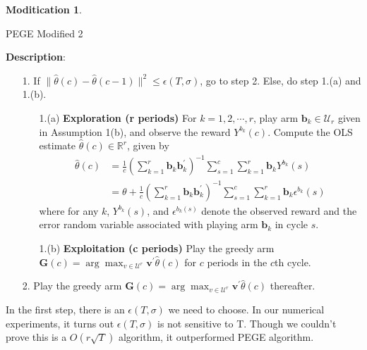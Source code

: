 \documentclass{article}
\theoremstyle{plain}
\theoremstyle{definition}
\newtheorem{modification}{Moditication}
\begin{document}
\begin{modification}
\begin{algorithm}\label{alg:PEGE2}
\caption{PEGE Modified 2}
\textbf{Description}: 
\begin{itemize}
\item [1.  ] If $\|\hat{\theta}(c)-\hat{\theta}(c-1)\|^{2}\leq \epsilon(T,\sigma)$, go to step 2. Else, do step 1.(a) and 1.(b).
\begin{enumerate}
\item [1.(a) ] \textbf{Exploration (r periods)} For $k=1,2,\cdots,r$, play arm $\textbf{b}_{k}\in \mathcal{U}_{r}$ given in Assumption 1(b), and observe the reward $Y^{b_{k}}(c)$. Compute the OLS estimate $\hat{\theta}(c)\in \mathbb{R}^{r}$, given by
\begin{align}
\hat{\theta}(c)&=\frac{1}{c}(\sum_{k=1}^{r}\textbf{b}_{k}\textbf{b}_{k}^{'})^{-1}\sum_{s=1}^{c}\sum_{k=1}^{r}\textbf{b}_{k}Y^{b_{k}}(s) \nonumber \\
&=\theta+\frac{1}{c}(\sum_{k=1}^{r}\textbf{b}_{k}\textbf{b}_{k}^{'})^{-1}\sum_{s=1}^{c}\sum_{k=1}^{r}\textbf{b}_{k}\epsilon^{b_{k}}(s) \nonumber 
\end{align}
where for any $k$, $Y^{b_{k}}(s)$, and $\epsilon^{b_{k}(s)}$ denote the observed reward and the error random variable associated with playing arm $\textbf{b}_{k}$ in cycle $s$.
\item [1.(b) ] \textbf{Exploitation (c periods)} Play the greedy arm $\textbf{G}(c)=\arg \max_{v\in \mathcal{U}^{r}}\textbf{v}^{'}\hat{\theta}(c)$ for $c$ periods in the $c$th cycle.
\end{enumerate}
\item [2.  ] Play the greedy arm $\textbf{G}(c)=\arg \max_{v\in \mathcal{U}^{r}}\textbf{v}^{'}\hat{\theta}(c)$ thereafter.
\end{itemize}

\end{algorithm}
In the first step, there is an $\epsilon(T,\sigma)$ we need to choose. In our numerical experiments, it turns out $\epsilon(T,\sigma)$ is not sensitive to T. Though we couldn't prove this is a $O(r\sqrt{T})$ algorithm, it outperformed PEGE algorithm.

\end{modification}
\end{document}
